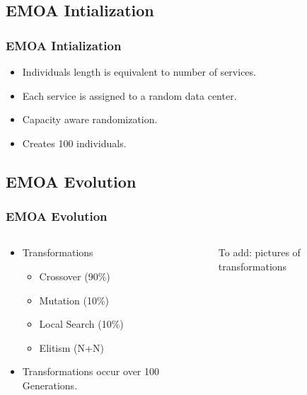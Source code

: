 \documentclass{beamer}
\begin{document}
\subsection[Intialization]{EMOA Intialization}

\begin{frame}
\frametitle{EMOA Intialization}
  \begin{itemize}
	\item Individuals length is equivalent to number of services.
	\item Each service is assigned to a random data center. 
	\item Capacity aware randomization.
	\item Creates 100 individuals.
  \end{itemize}
\end{frame}

\subsection[Evolution]{EMOA Evolution}
\begin{frame}
\frametitle{EMOA Evolution}
\begin{columns}
\begin{column}{0.65\textwidth}
  \begin{itemize}
	\item Transformations
		\begin{itemize}
		\item Crossover (90\%)
		\item Mutation (10\%)
		\item Local Search (10\%)
		\item Elitism (N+N)
		\end{itemize}
	\item Transformations occur over 100 Generations.
  \end{itemize}
\end{column}
\begin{column}{0.35\textwidth}
To add: pictures of transformations
\end{column}
\end{columns}
\end{frame}
\end{document}

